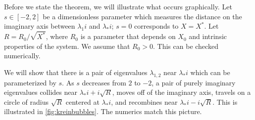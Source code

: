 \documentclass[thesis.tex]{subfiles}
\begin{document}
Before we state the theorem, we will illustrate what occurs graphically. Let $s \in [-2, 2]$ be a dimensionless parameter which measures the distance on the imaginary axis between $\lambda_1 i$ and $\lambda_* i$; $s = 0$ corresponds to $X = X^*$. Let $R = R_0 / \sqrt{X^*}$, where $R_0$ is a parameter that depends on $X_0$ and intrinsic properties of the system. We assume that $R_0 > 0$. This can be checked numerically.

We will show that there is a pair of eigenvalues $\lambda_{1,2}$ near $\lambda_* i$ which can be parameterized by $s$. As $s$ decreases from $2$ to $-2$, a pair of purely imaginary eigenvalues collides near $\lambda_* i + i \sqrt{R}$, moves off of the imaginary axis, travels on a circle of radius $\sqrt{R}$ centered at $\lambda_* i$, and recombines near $\lambda_* i - i \sqrt{R}$. This is illustrated in \cref{fig:kreinbubbles}. The numerics match this picture.
\end{document}
